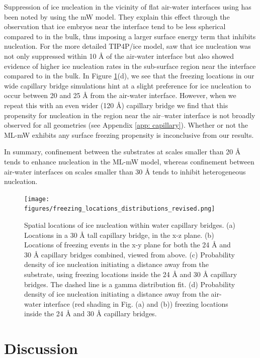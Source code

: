 \documentclass[journal abbreviation, manuscript]{copernicus}
\begin{document}
Suppression of ice nucleation in the vicinity of flat air-water interfaces using has been noted by \citet{haji-akbari2014suppression} using the mW model. They explain this effect through the observation that ice embryos near the interface tend to be less spherical compared to in the bulk, thus imposing a larger surface energy term that inhibits nucleation. For the more detailed TIP4P/ice model, \citet{haji-akbari2017surface} saw that ice nucleation was not only suppressed within 10 \AA{} of the air-water interface but also showed evidence of higher ice nucleation rates in the sub-surface region near the interface compared to in the bulk. In Figure \ref{fig:freezinglocations}(d), we see that the freezing locations in our wide capillary bridge simulations hint at a slight preference for ice nucleation to occur between 20 and 25 \AA{} from the air-water interface. However, when we repeat this with an even wider (120 \AA{}) capillary bridge we find that this propensity for nucleation in the region near the air--water interface is not broadly observed for all geometries (see Appendix \ref{app: capillary}). Whether or not the ML-mW exhibits any surface freezing propensity is inconclusive from our results.

In summary, confinement between the substrates at scales smaller than 20 \AA{} tends to enhance nucleation in the ML-mW model, whereas confinement between air-water interfaces on scales smaller than 30 \AA{} tends to inhibit heterogeneous nucleation.


\begin{figure}[t]
\texttt{[image: figures/freezing\_locations\_distributions\_revised.png]}
\caption{Spatial locations of ice nucleation within water capillary bridges. (a) Locations in a 30 \AA{} tall capillary bridge, in the x-z plane. (b) Locations of freezing events in the x-y plane for both the 24 \AA{} and 30 \AA{} capillary bridges combined, viewed from above. (c) Probability density of ice nucleation initiating a distance away from the substrate, using freezing locations inside the 24 \AA{} and 30 \AA{} capillary bridges. The dashed line is a gamma distribution fit. (d) Probability density of ice nucleation initiating a distance away from the air-water interface (red shading in Fig. (a) and (b)) freezing locations inside the 24 \AA{} and 30 \AA{} capillary bridges.\label{fig:freezinglocations}}
\end{figure}


\section{Discussion}
\end{document}
